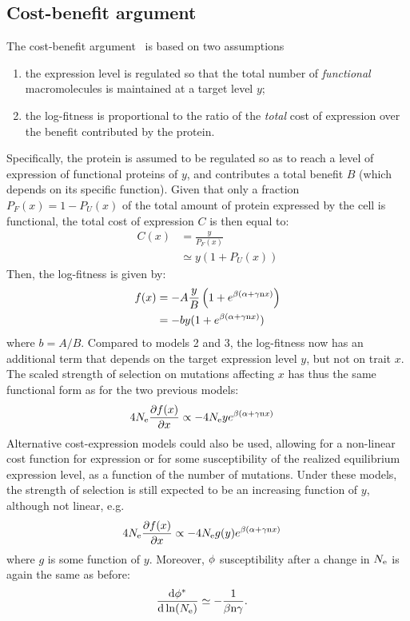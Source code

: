 \subsection{Cost-benefit argument}
The cost-benefit argument~\citep{Beaulieu2018} is based on two assumptions
\begin{enumerate}
 \item the expression level is regulated so that the total number of \emph{functional} macromolecules is maintained at a target level $y$;
 \item the log-fitness is proportional to the ratio of the \emph{total} cost of expression over the benefit contributed by the protein.
\end{enumerate}
Specifically, the protein is assumed to be regulated so as to reach a level of expression of functional proteins of $y$, and contributes a total benefit $B$ (which depends on its specific function). Given that only a fraction $P_{F}(x) = 1-P_{U}(x)$ of the total amount of protein expressed by the cell is functional, the total cost of expression $C$ is then equal to:
\begin{align}
C(x) & = \frac{y}{P_{F}(x)}
\\ & \simeq y (1 + P_{U}(x))
\end{align}
Then, the log-fitness is given by:
\begin{align}
f (x) & = -A \frac{y}{B} \left( 1 + e^{\beta(\alpha + \gamma\text{n} x)} \right)
\\
& = -by (1 + e^{\beta(\alpha + \gamma\text{n} x)})
\end{align}
where $b = A /B$. Compared to models 2 and 3, the log-fitness now has an additional term that depends on the target expression level $y$, but not on trait $x$. The scaled strength of selection on mutations affecting $x$ has thus the same functional form as for the two previous models:
\begin{align}
4 N_{\mathrm{e}} \frac{\partial  f (x)}{\partial x} & \propto -4 N_{\mathrm{e}} y e^{\beta(\alpha + \gamma\text{n} x)}
\end{align}
Alternative cost-expression models could also be used, allowing for a non-linear cost function for expression or for some susceptibility of the realized equilibrium expression level, as a function of the number of mutations. Under these models, the strength of selection is still expected to be an increasing function of $y$, although not linear, e.g.
\begin{align}
4 N_{\mathrm{e}} \frac{\partial  f (x)}{\partial x} & \propto -4 N_{\mathrm{e}} g(y) e^{\beta(\alpha + \gamma\text{n} x)}
\end{align}
where $g$ is some function of $y$.
Moreover, $\phi$ susceptibility after a change in $N_{\mathrm{e}}$ is again the same as before:
\begin{align}
\frac{ \mathrm{d} \phi^{*}}{\mathrm{d} \ln (N_{\mathrm{e}})} & \simeq - \frac{1}{\beta \text{n} \gamma}.
\end{align}
